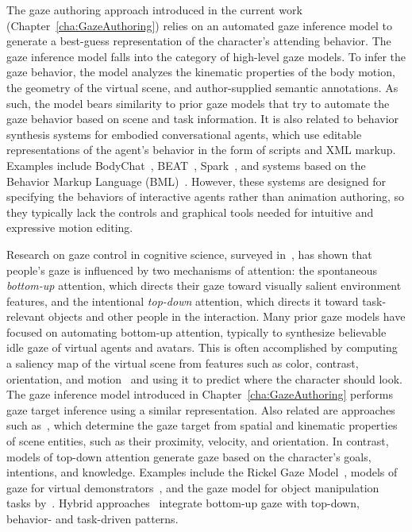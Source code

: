 The gaze authoring approach introduced in the current work (Chapter~\ref{cha:GazeAuthoring}) relies on an automated gaze inference model to generate a best-guess representation of the character's attending behavior. The gaze inference model falls into the category of high-level gaze models. To infer the gaze behavior, the model analyzes the kinematic properties of the body motion, the geometry of the virtual scene, and author-supplied semantic annotations. As such, the model bears similarity to prior gaze models that try to automate the gaze behavior based on scene and task information. It is also related to behavior synthesis systems for embodied conversational agents, which use editable representations of the agent's behavior in the form of scripts and XML markup. Examples include BodyChat~\citep{vilhjalmsson1998bodychat}, BEAT~\citep{cassell1999fully}, Spark~\citep{vilhjalmsson2004animating}, and systems based on the Behavior Markup Language (BML)~\citep{vilhjalmsson2007bml}. However, these systems are designed for specifying the behaviors of interactive agents rather than animation authoring, so they typically lack the controls and graphical tools needed for intuitive and expressive motion editing.

Research on gaze control in cognitive science, surveyed in~\citep{henderson2003human}, has shown that people's gaze is influenced by two mechanisms of attention: the spontaneous \emph{bottom-up} attention, which directs their gaze toward visually salient environment features, and the intentional \emph{top-down} attention, which directs it toward task-relevant objects and other people in the interaction.
Many prior gaze models have focused on automating bottom-up attention, typically to synthesize believable idle gaze of virtual agents and avatars. This is often accomplished by computing a saliency map of the virtual scene from features such as color, contrast, orientation, and motion~\citep{peters2003bottomup,peters2008applying} and using it to predict where the character should look. The gaze inference model introduced in Chapter~\ref{cha:GazeAuthoring} performs gaze target inference using a similar representation.
Also related are approaches such as~\citep{cafaro2009animating,grillon2009crowds,kokkinara2011modelling}, which determine the gaze target from spatial and kinematic properties of scene entities, such as their proximity, velocity, and orientation. In contrast, models of top-down attention generate gaze based on the character's goals, intentions, and knowledge. Examples include the Rickel Gaze Model~\citep{lee2007rickel}, models of gaze for virtual demonstrators~\citep{huang2016planning}, and the gaze model for object manipulation tasks by~\citet{bai2012synthesis}. Hybrid approaches~\citep{khullar2001look,mitake2007reactive} integrate bottom-up gaze with top-down, behavior- and task-driven patterns.

